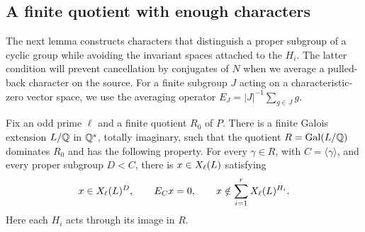 \subsection{A finite quotient with enough characters}

The next lemma constructs characters that distinguish a proper
subgroup of a cyclic group while avoiding the invariant spaces attached
to the $H_i$. The latter condition will prevent cancellation by
conjugates of $N$ when we average a pulled-back character on the source.
For a finite subgroup $J$ acting on a characteristic-zero vector space,
we use the averaging operator $E_J=|J|^{-1}\sum_{g\in J}g$.

\begin{lemma}\label{lem:quotient-amplification}
Fix an odd prime $\ell$ and a finite quotient $R_0$ of $P$. There is
a finite Galois extension $L/\mathbb Q$ in $\mathbb Q^s$, totally imaginary, such that
the quotient $R=\operatorname{Gal}(L/\mathbb Q)$ dominates $R_0$ and has the following
property. For every $\gamma\in R$, with $C=\langle\gamma\rangle$, and
every proper subgroup $D<C$, there is $x\in X_{\ell}(L)$ satisfying
\begin{equation}\label{eq:separating-character}
 x\in X_{\ell}(L)^{D},\qquad E_Cx=0,\qquad
 x\notin\sum_{i=1}^rX_{\ell}(L)^{H_i}.
\end{equation}
Here each $H_i$ acts through its image in $R$.
\end{lemma}

